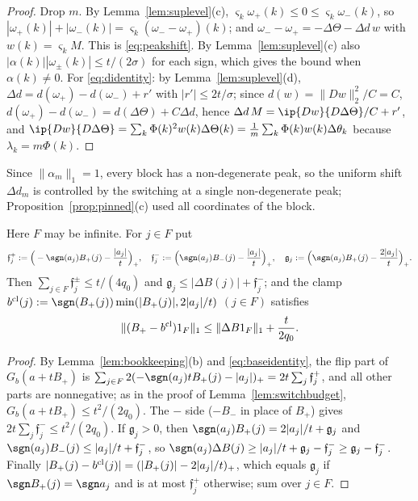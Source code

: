 \begin{proof}
Drop $m$.  By Lemma~\ref{lem:suplevel}(c), $\varsigma_k\omega_+(k)\le0\le
\varsigma_k\omega_-(k)$, so $|\omega_+(k)|+|\omega_-(k)|=\varsigma_k(\omega_-
-\omega_+)(k)$; and $\omega_--\omega_+=-\Delta\Theta-\Delta d\,w$ with
$w(k)=\varsigma_kM$.  This is \eqref{eq:peakshift}.  By
Lemma~\ref{lem:suplevel}(c) also $|\alpha(k)||\omega_\pm(k)|\le t/(2\sigma)$
for each sign, which gives the bound when $\alpha(k)\ne0$.  For
\eqref{eq:didentity}: by Lemma~\ref{lem:suplevel}(d), $\Delta d=d(\omega_+)-
d(\omega_-)+r'$ with $|r'|\le2t/\sigma$; since $d(w)=\|Dw\|_2^2/C=C$,
$d(\omega_+)-d(\omega_-)=d(\Delta\Theta)+C\Delta d$, hence $\Delta d\,M=
\ip{Dw}{D\Delta\Theta}/C+r'$, and $\ip{Dw}{D\Delta\Theta}=\sum_k\Phi(k)^2w(k)
\Delta\Theta(k)=\frac1m\sum_k\Phi(k)w(k)\Delta\theta_k$ because
$\lambda_k=m\Phi(k)$.
\end{proof}

Since $\|\alpha_m\|_1=1$, every block has a non-degenerate peak, so the
uniform shift $\Delta d_m$ is controlled by the switching at a single
non-degenerate peak; Proposition~\ref{prop:pinned}(c) used all
coordinates of the block.

\begin{lemma}\label{lem:flip}
Here $F$ may be infinite.  For $j\in F$ put
\[
 \mathfrak f^+_j:=\Big(-\sgn(a_j)B_+(j)-\frac{|a_j|}t\Big)_+,\quad
 \mathfrak f^-_j:=\Big(\sgn(a_j)B_-(j)-\frac{|a_j|}t\Big)_+,\quad
 \mathfrak g_j:=\Big(\sgn(a_j)B_+(j)-\frac{2|a_j|}t\Big)_+ .
\]
Then $\sum_{j\in F}\mathfrak f^\pm_j\le t/(4q_0)$ and $\mathfrak g_j\le
|\Delta B(j)|+\mathfrak f^-_j$; and the clamp $b^{\rm cl}(j):=\sgn(B_+(j))
\min(|B_+(j)|,2|a_j|/t)$ $(j\in F)$ satisfies
\[
 \|(B_+-b^{\rm cl})1_F\|_1\le\|\Delta B1_F\|_1+\frac t{2q_0}.
\]
\end{lemma}

\begin{proof}
By Lemma~\ref{lem:bookkeeping}(b) and \eqref{eq:baseidentity}, the flip
part of $G_b(a+tB_+)$ is $\sum_{j\in F}2(-\sgn(a_j)tB_+(j)-|a_j|)_+=
2t\sum_j\mathfrak f^+_j$, and all other parts are nonnegative; as in the
proof of Lemma~\ref{lem:switchbudget}, $G_b(a+tB_+)\le t^2/(2q_0)$.  The
$-$ side ($-B_-$ in place of $B_+$) gives $2t\sum_j\mathfrak f^-_j\le
t^2/(2q_0)$.  If $\mathfrak g_j>0$, then $\sgn(a_j)B_+(j)=2|a_j|/t+\mathfrak
g_j$ and $\sgn(a_j)B_-(j)\le|a_j|/t+\mathfrak f^-_j$, so
$\sgn(a_j)\Delta B(j)\ge|a_j|/t+\mathfrak g_j-\mathfrak f^-_j\ge\mathfrak
g_j-\mathfrak f^-_j$.  Finally $|B_+(j)-b^{\rm cl}(j)|=(|B_+(j)|-2|a_j|/t)_+$,
which equals $\mathfrak g_j$ if $\sgn B_+(j)=\sgn a_j$ and is at most
$\mathfrak f^+_j$ otherwise; sum over $j\in F$.
\end{proof}


